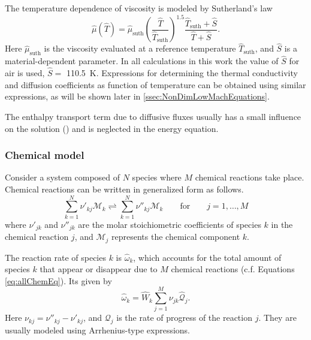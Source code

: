 The temperature dependence of viscosity is modeled by Sutherland's law \citep{sutherlandLIIViscosityGases1893}
\begin{equation}\label{eq:DimSutherland}
	\hat{\mu}(\hat{T}) = \hat{\mu}_{\text{suth}}\left(\frac{\hat{T}}{\hat{T}_{\text{suth}}}\right)^{1.5}\frac{\hat{T}_{\text{suth}} + \hat{S}}{\hat{T}+\hat{S}}.
\end{equation}
Here $\hat{\mu}_{\text{suth}}$ is the viscosity evaluated at a reference temperature $\hat{T}_{\text{suth}}$, and $\hat S$ is a material-dependent parameter. In all calculations in this work the value of $\hat{S}$ for air is used, $\hat{S} = $ \SI{110.5}{\kelvin}. Expressions for determining the thermal conductivity and diffusion coefficients as function of temperature can be obtained using similar expressions, as will be shown later in \cref{ssec:NonDimLowMachEquations}.

The enthalpy transport term due to diffusive fluxes usually has a small influence on the solution (\cite{smokeFormulationPremixedNonpremixed1991, goeyModelingSmallScale1995,paxionDevelopmentParallelUnstructured2001}) and is neglected in the energy equation. 

\subsubsection{Chemical model}
Consider a system composed of $N$ species where $M$ chemical reactions take place. Chemical reactions can be written in generalized form as follows.
\begin{equation}\label{eq:allChemEq}
	\sum_{k=1}^{N} \nu'_{kj}\mathcal{M}_k  \rightleftharpoons \sum_{k=1}^{N} \nu''_{kj}\mathcal{M}_k  \qquad \text{for}\qquad j=1,\dots,M
\end{equation}
where $\nu'_{jk}$ and $\nu''_{jk}$ are the molar stoichiometric coefficients of species $k$ in the chemical reaction $j$, and $\mathcal{M}_j$ represents the chemical component $k$. \newline

The reaction rate of species $k$ is $\hat \omega_k$, which accounts for the total amount of species $k$ that appear or disappear due to $M$ chemical reactions (c.f. Equations \eqref{eq:allChemEq}). Its given by
\begin{equation} \label{eq:reacRateDef}
	\hat \omega_k  = \hat W_k \sum_{j=1}^{M}\nu_{jk}\hat{\mathcal{Q}}_j.
\end{equation}
Here $\nu_{kj} = \nu''_{kj} -\nu'_{kj}$, and $\mathcal{Q}_j$ is the rate of progress of the reaction $j$. They are usually modeled using Arrhenius-type expressions.\newline


